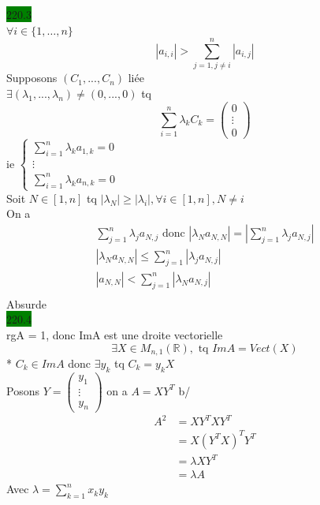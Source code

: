 \documentclass{article}
\begin{document}
\noindent \colorbox{green}{220.3}\\
\(\forall i \in \{1,\dots,n\}\)\begin{equation*}
    |a_{i,i}|> \sum_{j=1,j\neq i}^{n}|a_{i,j}|
\end{equation*}
Supposons \((C_1,...,C_n)\) liée\\
\(\exists (\lambda_1, ...,\lambda_n) \neq (0,...,0)\)
tq\\
\begin{equation*}
    \sum_{i=1}^{n}\lambda_k C_k = \begin{pmatrix}
        0\\\vdots\\0
    \end{pmatrix}
\end{equation*}
ie \(\begin{cases}
    \sum_{i=1}^{n}\lambda_k a_{1,k} = 0\\
    \vdots\\
    \sum_{i=1}^{n}\lambda_k a_{n,k} = 0
\end{cases}\)\\
Soit \(N \in [1,n]\) tq \(|\lambda_N| \geq |\lambda_i|, \forall i \in [1,n], N\neq i\)\\
On a \begin{align*}
    \sum_{j=1}^{n}\lambda_j a_{N, j}
    \text{ donc } |\lambda_N a_{N,N}| = |\sum_{j=1}^{n} \lambda_j a_{N,j}|\\
     |\lambda_N a_{N,N}| \leq \sum_{j=1}^{n} |\lambda_j a_{N,j}|\\
      |a_{N,N}| < \sum_{j=1}^{n} |\lambda_N a_{N,j}|\\
\end{align*}
Absurde\\
\noindent
\colorbox{green}{220.4}\\
rgA = 1, donc ImA est une droite vectorielle \begin{equation*}
    \exists X \in M_{n,1}(\mathbb{R}), \text{ tq } ImA = Vect(X)
\end{equation*}
* \(C_k \in ImA\) donc \(\exists y_k\) tq  \(C_k = y_k X\)\\
Posons \(Y = \begin{pmatrix}
    y_1\\\vdots\\y_n
\end{pmatrix}\) on a \(A = XY^T\)
b/ \begin{align*}
    A^2 &= XY^TXY^T\\
    &= X(Y^TX)^TY^T\\
    &= \lambda XY^T\\
    &= \lambda A
\end{align*}
Avec \(\lambda = \sum_{k=1}^{n}x_ky_k\)\\
\end{document}
